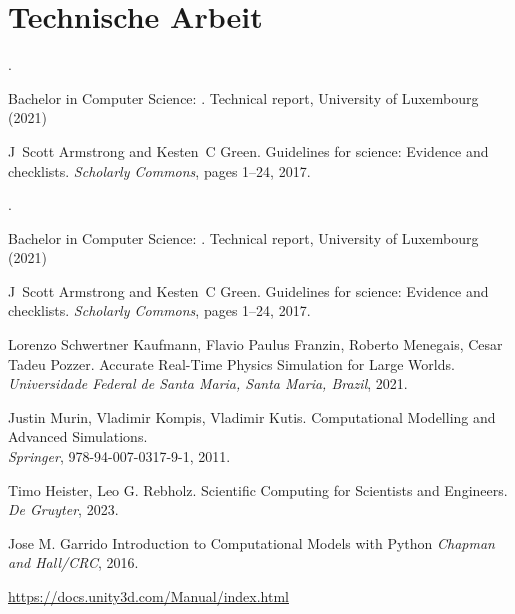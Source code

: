\documentclass[conference,compsoc]{IEEEtran}
\begin{document}
\section{Technische Arbeit}
\begin{thebibliography}{1}
.

{Bachelor in Computer Science}:
.
\newblock Technical report, University of Luxembourg (2021)

J~Scott Armstrong and Kesten~C Green.
\newblock Guidelines for science: Evidence and checklists.
\newblock \emph{Scholarly Commons}, pages 1--24, 2017.

	.
	
	{Bachelor in Computer Science}:
	.
	\newblock Technical report, University of Luxembourg (2021)
	
	J~Scott Armstrong and Kesten~C Green.
	\newblock Guidelines for science: Evidence and checklists.
	\newblock \emph{Scholarly Commons}, pages 1--24, 2017.
	
	Lorenzo Schwertner Kaufmann, Flavio Paulus Franzin, Roberto Menegais, Cesar Tadeu Pozzer.
	\newblock Accurate Real-Time Physics Simulation for Large Worlds.
	\newblock \emph{Universidade Federal de Santa Maria, Santa Maria, Brazil}, 2021.
	
	Justin Murin, Vladimir Kompis, Vladimir Kutis.
	\newblock Computational Modelling and Advanced Simulations. \\
	\newblock \emph{Springer}, 978-94-007-0317-9-1, 2011.
	
	Timo Heister, Leo G. Rebholz.
	\newblock Scientific Computing for Scientists and Engineers.
	\newblock \emph{De Gruyter}, 2023.
	
	Jose M. Garrido
	\newblock Introduction to Computational Models with Python
	\newblock \emph{Chapman and Hall/CRC}, 2016.
	
	\newblock \href{https://docs.unity3d.com/Manual/index.html}{https://docs.unity3d.com/Manual/index.html}

\end{thebibliography}
\end{document}
